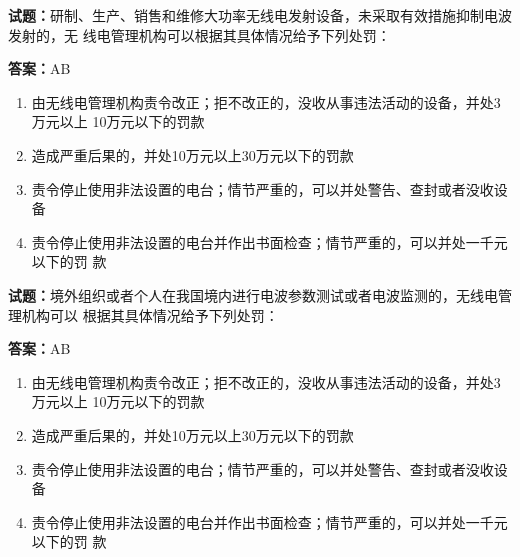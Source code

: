 \documentclass{ctexbook}
\begin{document}
\textbf{试题：}研制、生产、销售和维修大功率无线电发射设备，未采取有效措施抑制电波发射的，无
线电管理机构可以根据其具体情况给予下列处罚： 

\textbf{答案：}AB 

\begin{enumerate}[leftmargin=3em]
  \item 由无线电管理机构责令改正；拒不改正的，没收从事违法活动的设备，并处3万元以上
10万元以下的罚款 

  \item 造成严重后果的，并处10万元以上30万元以下的罚款 

  \item 责令停止使用非法设置的电台；情节严重的，可以并处警告、查封或者没收设备 

  \item 责令停止使用非法设置的电台并作出书面检查；情节严重的，可以并处一千元以下的罚
款 

\end{enumerate}






\vspace{1em}

\textbf{试题：}境外组织或者个人在我国境内进行电波参数测试或者电波监测的，无线电管理机构可以
根据其具体情况给予下列处罚： 

\textbf{答案：}AB 

\begin{enumerate}[leftmargin=3em]
  \item 由无线电管理机构责令改正；拒不改正的，没收从事违法活动的设备，并处3万元以上
10万元以下的罚款 

  \item 造成严重后果的，并处10万元以上30万元以下的罚款 

  \item 责令停止使用非法设置的电台；情节严重的，可以并处警告、查封或者没收设备 

  \item 责令停止使用非法设置的电台并作出书面检查；情节严重的，可以并处一千元以下的罚
款 

\end{enumerate}





\vspace{1em}
\end{document}
